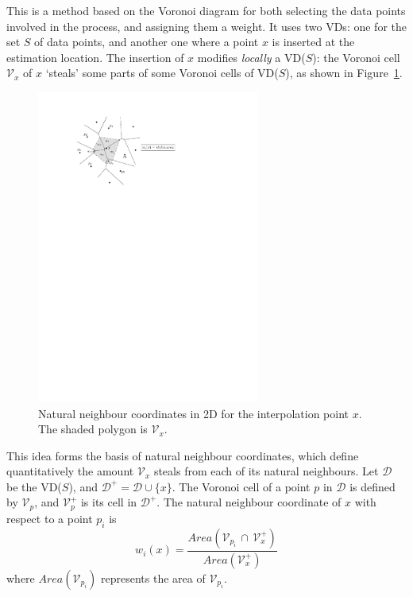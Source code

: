 This is a method based on the Voronoi diagram for both selecting the data points involved in the process, and assigning them a weight.  
It uses two VDs: one for the set $S$ of data points, and another one where a point $x$ is inserted at the estimation location. 
The insertion of $x$ modifies \emph{locally} a VD($S$): the Voronoi cell $\mathcal{V}_{x}$ of $x$ `steals' some parts of some Voronoi cells of VD($S$), as shown in Figure~\ref{fig:nnc}.
\begin{figure}
  \centering
  \includegraphics[width=0.65\textwidth]{figs/nnc}
  \caption{Natural neighbour coordinates in 2D for the interpolation point $x$. The shaded polygon is $\mathcal{V}_{x}$.} 
\label{fig:nnc}
\end{figure}
This idea forms the basis of natural neighbour coordinates, which define quantitatively the amount $\mathcal{V}_{x}$ steals from each of its natural neighbours. 
Let $\mathcal{D}$ be the VD($S$), and $\mathcal{D}^{+} = \mathcal{D} \cup \{x\}$. 
The Voronoi cell of a point $p$ in $\mathcal{D}$ is defined by $\mathcal{V}_{p}$, and $\mathcal{V}^{+}_{p}$ is its cell in $\mathcal{D}^{+}$. 
The natural neighbour coordinate of $x$ with respect to a point $p_{i}$ is
\begin{equation}
  w_{i}(x) = \frac{Area(\mathcal{V}_{p_{i}} \, \cap \, \mathcal{V}^{+}_{x})}{Area(\mathcal{V}^{+}_{x})}
  \label{eq:nnc}
\end{equation}
where $Area(\mathcal{V}_{p_{i}})$ represents the area of $\mathcal{V}_{p_{i}}$. 
